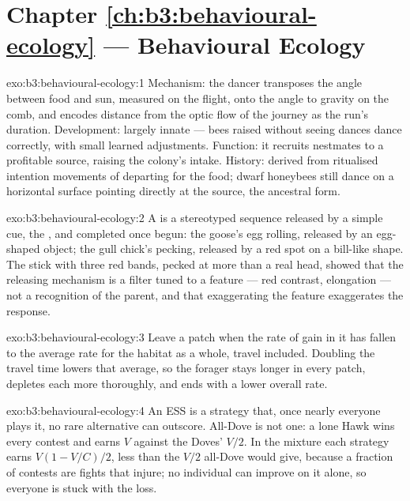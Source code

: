 \section*{Chapter \ref{ch:b3:behavioural-ecology} --- Behavioural Ecology}

\begin{solution}{exo:b3:behavioural-ecology:1}
Mechanism: the dancer transposes the angle between food and sun,
measured on the flight, onto the angle to gravity on the comb, and
encodes distance from the optic flow of the journey as the run's
duration. Development: largely innate --- bees raised without seeing
dances dance correctly, with small learned adjustments. Function: it
recruits nestmates to a profitable source, raising the colony's intake.
History: derived from ritualised intention movements of departing for
the food; dwarf honeybees still dance on a horizontal surface pointing
directly at the source, the ancestral form.
\end{solution}

\begin{solution}{exo:b3:behavioural-ecology:2}
A  is a stereotyped sequence released by a simple
cue, the , and completed once begun: the goose's egg
rolling, released by an egg-shaped object; the gull chick's pecking,
released by a red spot on a bill-like shape. The stick with three red
bands, pecked at more than a real head, showed that the releasing
mechanism is a filter tuned to a feature --- red contrast, elongation ---
not a recognition of the parent, and that exaggerating the feature
exaggerates the response.
\end{solution}

\begin{solution}{exo:b3:behavioural-ecology:3}
Leave a patch when the rate of gain in it has fallen to the average
rate for the habitat as a whole, travel included. Doubling the travel
time lowers that average, so the forager stays longer in every patch,
depletes each more thoroughly, and ends with a lower overall rate.
\end{solution}

\begin{solution}{exo:b3:behavioural-ecology:4}
An ESS is a strategy that, once nearly everyone plays it, no rare
alternative can outscore. All-Dove is not one: a lone Hawk wins every
contest and earns $V$ against the Doves' $V/2$. In the mixture each
strategy earns $V(1 - V/C)/2$, less than the $V/2$ all-Dove would give,
because a fraction of contests are fights that injure; no individual
can improve on it alone, so everyone is stuck with the loss.
\end{solution}

